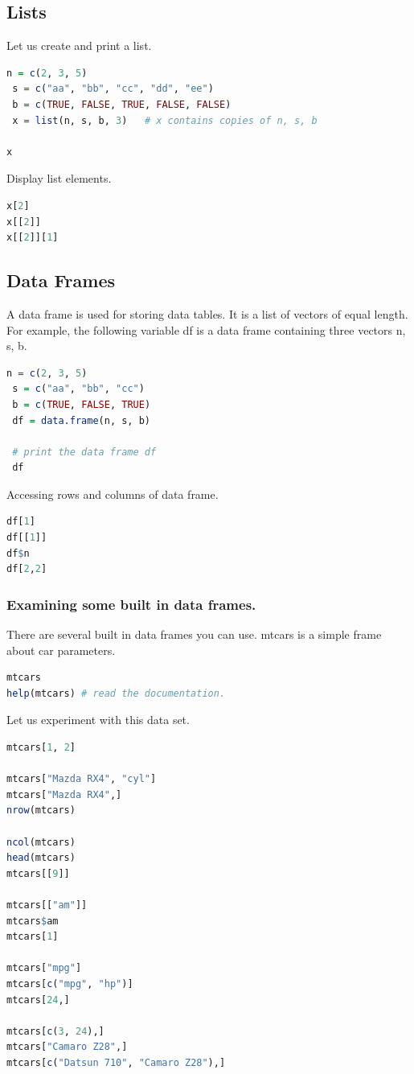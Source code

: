 \documentclass["../Applied_probabillity _and_statistics_lab_KTU.tex"]{subfiles}
\begin{document}
\subsection{Lists}
Let us create and print  a list.
\begin{lstlisting}[language=R]
 n = c(2, 3, 5) 
 s = c("aa", "bb", "cc", "dd", "ee") 
 b = c(TRUE, FALSE, TRUE, FALSE, FALSE) 
 x = list(n, s, b, 3)   # x contains copies of n, s, b

x
\end{lstlisting}
Display list elements.
\begin{lstlisting}[language=R]
x[2]
x[[2]]
x[[2]][1]
\end{lstlisting}


\subsection{Data Frames}

A data frame is used for storing data tables. It is a list of vectors of equal length. For example, the following variable df is a data frame containing three vectors n, s, b.
\begin{lstlisting}[language=R]
 n = c(2, 3, 5) 
 s = c("aa", "bb", "cc") 
 b = c(TRUE, FALSE, TRUE) 
 df = data.frame(n, s, b)  
 
 # print the data frame df
 df
\end{lstlisting}


Accessing rows and columns of data frame.
\begin{lstlisting}[language=R]
df[1]
df[[1]]
df$n
df[2,2]

\end{lstlisting}
\subsubsection{Examining some built in data frames.}
There are several built in data frames you can use. mtcars is a simple frame about car parameters.
\begin{lstlisting}[language=R]
 mtcars
help(mtcars) # read the documentation.
\end{lstlisting}
 Let us experiment with this data set.
 
 \begin{lstlisting}[language=R]
mtcars[1, 2]

mtcars["Mazda RX4", "cyl"] 
mtcars["Mazda RX4",]
nrow(mtcars) 

ncol(mtcars)  
head(mtcars)
mtcars[[9]] 

mtcars[["am"]] 
mtcars$am
mtcars[1] 

mtcars["mpg"]
mtcars[c("mpg", "hp")]
mtcars[24,] 

mtcars[c(3, 24),] 
mtcars["Camaro Z28",] 
mtcars[c("Datsun 710", "Camaro Z28"),]
\end{lstlisting}
\end{document}

